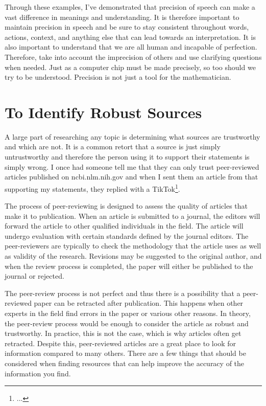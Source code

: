 \documentclass[10pt, a4paper, twocolumn]{book}
\begin{document}
Through these examples, I've demonstrated that precision of speech can make a vast difference in meanings and understanding. It is therefore important to maintain precision in speech and be sure to stay consistent throughout words, actions, context, and anything else that can lead towards an interpretation. It is also important to understand that we are all human and incapable of perfection. Therefore, take into account the imprecision of others and use clarifying questions when needed. Just as a computer chip must be made precisely, so too should we try to be understood. Precision is not just a tool for the mathematician.














\sectionEnd

\section{To Identify Robust Sources}

A large part of researching any topic is determining what sources are trustworthy and which are not. It is a common retort that a source is just simply untrustworthy and therefore the person using it to support their statements is simply wrong. I once had someone tell me that they can only trust peer-reviewed articles published on ncbi.nlm.nih.gov and when I sent them an article from that supporting my statements, they replied with a TikTok\footnote{...}.

The process of peer-reviewing is designed to assess the quality of articles that make it to publication. When an article is submitted to a journal, the editors will forward the article to other qualified individuals in the field. The article will undergo evaluation with certain standards defined by the journal editors. The peer-reviewers are typically to check the methodology that the article uses as well as validity of the research. Revisions may be suggested to the original author, and when the review process is completed, the paper will either be published to the journal or rejected. 

The peer-review process is not perfect and thus there is a possibility that a peer-reviewed paper can be retracted after publication. This happens when other experts in the field find errors in the paper or various other reasons. In theory, the peer-review process would be enough to consider the article as robust and trustworthy. In practice, this is not the case, which is why articles often get retracted. Despite this, peer-reviewed articles are a great place to look for information compared to many others. There are a few things that should be considered when finding resources that can help improve the accuracy of the information you find.
\end{document}
